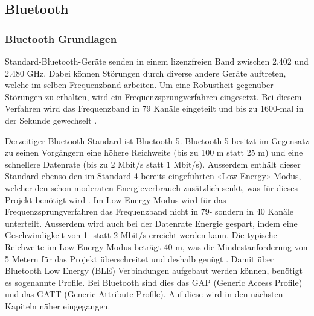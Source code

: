 \subsection{Bluetooth}\label{sec:bluetooth}

\subsubsection{Bluetooth Grundlagen}
Standard-Bluetooth-Geräte senden in einem lizenzfreien Band zwischen 2.402 und 2.480 GHz. Dabei können Störungen durch diverse andere Geräte auftreten, welche im selben Frequenzband arbeiten. Um eine Robustheit gegenüber Störungen zu erhalten, wird ein Frequenzsprungverfahren eingesetzt. Bei diesem Verfahren wird das Frequenzband in 79 Kanäle eingeteilt und bis zu 1600-mal in der Sekunde gewechselt \cite{5_Teildokument_BT}.

Derzeitiger Bluetooth-Standard ist Bluetooth 5. Bluetooth 5 besitzt im Gegensatz zu seinen Vorgängern eine höhere Reichweite (bis zu 100 m statt 25 m) und eine schnellere Datenrate (bis zu 2 Mbit/s statt 1 Mbit/s). Ausserdem enthält dieser Standard ebenso den im Standard 4 bereits eingeführten «Low Energy»-Modus, welcher den schon moderaten Energieverbrauch zusätzlich senkt, was für dieses Projekt benötigt wird \cite{5_Teildokument_BT}. Im Low-Energy-Modus wird für das Frequenzsprungverfahren das Frequenzband nicht in 79- sondern in 40 Kanäle unterteilt. Ausserdem wird auch bei der Datenrate Energie gespart, indem eine Geschwindigkeit von 1- statt 2 Mbit/s erreicht werden kann. Die typische Reichweite im Low-Energy-Modus beträgt 40 m, was die Mindestanforderung von 5 Metern für das Projekt überschreitet und deshalb genügt \cite{6_Teildokument_BT}. Damit über Bluetooth Low Energy (BLE) Verbindungen aufgebaut werden können, benötigt es sogenannte Profile. Bei Bluetooth sind dies das GAP (Generic Access Profile) und das GATT (Generic Attribute Profile). Auf diese wird in den nächsten Kapiteln näher eingegangen.

